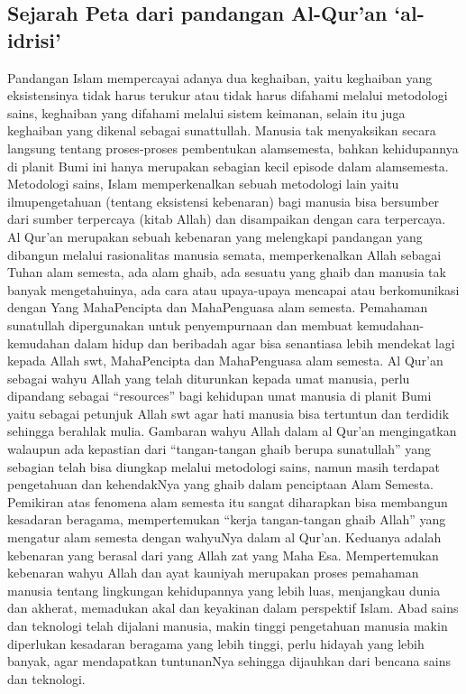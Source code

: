 \subsection {Sejarah Peta dari pandangan Al-Qur'an `al-idrisi'}
	Pandangan Islam mempercayai adanya dua keghaiban, yaitu keghaiban yang eksistensinya tidak harus terukur atau tidak harus difahami melalui metodologi sains, keghaiban yang difahami melalui sistem keimanan, selain itu juga keghaiban yang dikenal sebagai sunattullah. Manusia tak menyaksikan secara langsung tentang proses-proses pembentukan alamsemesta, bahkan kehidupannya di planit Bumi ini hanya merupakan sebagian kecil episode dalam alamsemesta.
	Metodologi sains, Islam memperkenalkan sebuah metodologi lain yaitu ilmupengetahuan (tentang eksistensi kebenaran) bagi manusia bisa bersumber dari sumber terpercaya (kitab Allah) dan disampaikan dengan cara terpercaya. Al Qur’an merupakan sebuah kebenaran yang melengkapi pandangan yang dibangun melalui rasionalitas manusia semata, memperkenalkan Allah sebagai Tuhan alam semesta, ada alam ghaib, ada sesuatu yang ghaib dan manusia tak banyak mengetahuinya, ada cara atau upaya-upaya mencapai atau berkomunikasi dengan Yang MahaPencipta dan MahaPenguasa alam semesta. Pemahaman sunatullah dipergunakan untuk penyempurnaan dan membuat kemudahan-kemudahan dalam hidup dan beribadah agar bisa senantiasa lebih mendekat lagi kepada Allah swt, MahaPencipta dan MahaPenguasa alam semesta.
	Al Qur’an sebagai wahyu Allah yang telah diturunkan kepada umat manusia, perlu dipandang sebagai “resources” bagi kehidupan umat manusia di planit Bumi yaitu sebagai petunjuk Allah swt agar hati manusia bisa tertuntun dan terdidik sehingga berahlak mulia. Gambaran wahyu Allah dalam al Qur'an mengingatkan walaupun ada kepastian dari “tangan-tangan ghaib berupa sunatullah” yang sebagian telah bisa diungkap melalui metodologi sains, namun masih terdapat pengetahuan dan kehendakNya yang ghaib dalam penciptaan Alam Semesta. 
	Pemikiran atas fenomena alam semesta itu sangat diharapkan bisa membangun kesadaran beragama, mempertemukan “kerja tangan-tangan ghaib Allah” yang mengatur alam semesta dengan wahyuNya dalam al Qur’an. Keduanya adalah kebenaran yang berasal dari yang Allah zat yang Maha Esa. Mempertemukan kebenaran wahyu Allah dan ayat kauniyah merupakan proses pemahaman manusia tentang lingkungan kehidupannya yang lebih luas, menjangkau dunia dan akherat, memadukan akal dan keyakinan dalam perspektif Islam. 
	Abad sains dan teknologi telah dijalani manusia, makin tinggi pengetahuan manusia makin diperlukan kesadaran beragama yang lebih tinggi, perlu hidayah yang lebih banyak, agar mendapatkan tuntunanNya sehingga dijauhkan dari bencana sains dan teknologi. 
